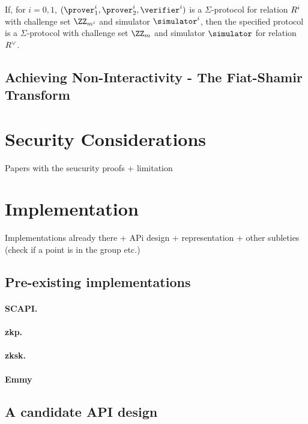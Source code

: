 \documentclass[runningheads]{llncs}
\begin{document}
\begin{theorem}
  If, for $i=0,1$, $(\prover_1^i,\prover_2^i,\verifier^i)$ is a $\Sigma$-protocol for relation $R^i$ with challenge set $\ZZ_{m^i}$ and simulator $\simulator^i$, then the specified protocol is a $\Sigma$-protocol with challenge set $\ZZ_m$ and simulator $\simulator$ for relation $R^\lor$.
\end{theorem}




\subsection{Achieving Non-Interactivity - The Fiat-Shamir Transform}


\section{Security Considerations}

Papers with the seucurity proofs + limitation

\section{Implementation}
Implementations already there + APi design + representation + other subleties (check if a point is in the group etc.)

\subsection{Pre-existing implementations}
\paragraph{SCAPI.}
\paragraph{zkp.}
\paragraph{zksk.}
\paragraph{Emmy}

\subsection{A candidate API design}
\end{document}
